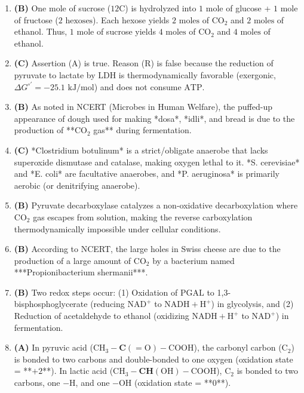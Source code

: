 \documentclass[11pt, a4paper]{article}
\begin{document}
\begin{enumerate}[label=\textbf{\arabic*.}]
\item \textbf{(B)} One mole of sucrose ($12\text{C}$) is hydrolyzed into $1\text{ mole}$ of glucose + $1\text{ mole}$ of fructose ($2\text{ hexoses}$). Each hexose yields $2\text{ moles}$ of $\text{CO}_2$ and $2\text{ moles}$ of ethanol. Thus, $1\text{ mole}$ of sucrose yields $4\text{ moles}$ of $\text{CO}_2$ and $4\text{ moles}$ of ethanol.

\item \textbf{(C)} Assertion (A) is true. Reason (R) is false because the reduction of pyruvate to lactate by $\text{LDH}$ is thermodynamically favorable (exergonic, $\Delta G^{\circ\prime} = -25.1\text{ kJ/mol}$) and does not consume $\text{ATP}$.

\item \textbf{(B)} As noted in NCERT (Microbes in Human Welfare), the puffed-up appearance of dough used for making *dosa*, *idli*, and bread is due to the production of **$\text{CO}_2$ gas** during fermentation.

\item \textbf{(C)} *Clostridium botulinum* is a strict/obligate anaerobe that lacks superoxide dismutase and catalase, making oxygen lethal to it. *S. cerevisiae* and *E. coli* are facultative anaerobes, and *P. aeruginosa* is primarily aerobic (or denitrifying anaerobe).

\item \textbf{(B)} Pyruvate decarboxylase catalyzes a non-oxidative decarboxylation where $\text{CO}_2$ gas escapes from solution, making the reverse carboxylation thermodynamically impossible under cellular conditions.

\item \textbf{(B)} According to NCERT, the large holes in Swiss cheese are due to the production of a large amount of $\text{CO}_2$ by a bacterium named ***Propionibacterium shermanii***.

\item \textbf{(B)} Two redox steps occur: (1) Oxidation of $\text{PGAL}$ to 1,3-bisphosphoglycerate (reducing $\text{NAD}^+$ to $\text{NADH} + \text{H}^+$) in glycolysis, and (2) Reduction of acetaldehyde to ethanol (oxidizing $\text{NADH} + \text{H}^+$ to $\text{NAD}^+$) in fermentation.

\item \textbf{(A)} In pyruvic acid ($\text{CH}_3-\mathbf{C}(=\text{O})-\text{COOH}$), the carbonyl carbon ($\text{C}_2$) is bonded to two carbons and double-bonded to one oxygen (oxidation state = **$+2$**). In lactic acid ($\text{CH}_3-\mathbf{CH}(\text{OH})-\text{COOH}$), $\text{C}_2$ is bonded to two carbons, one $-\text{H}$, and one $-\text{OH}$ (oxidation state = **$0$**).


\end{enumerate}
\end{document}
